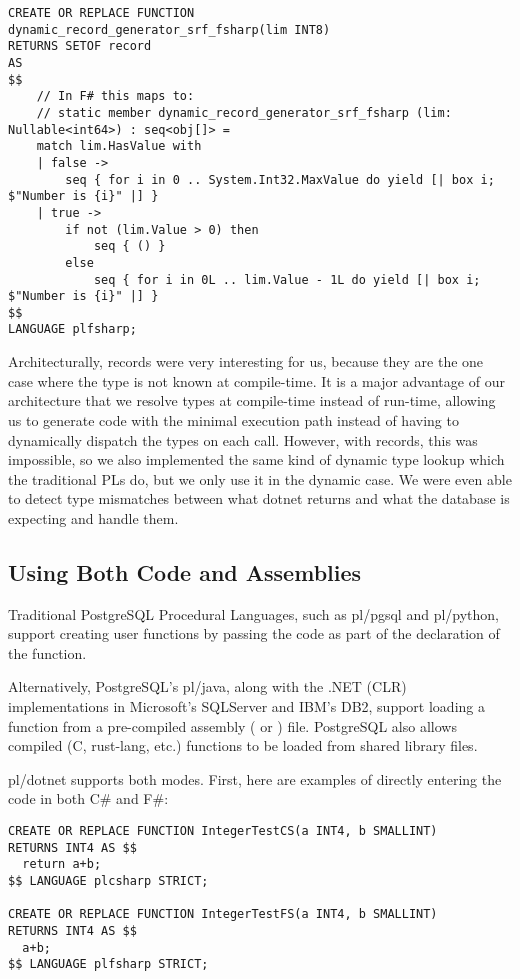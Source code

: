 \documentclass[sigconf,techreport,authorversion,nonacm]{acmart}
\newcommand{\dotnet}{.NET }
\begin{document}
\begin{listing}[H]
\begin{verbatim}
CREATE OR REPLACE FUNCTION
dynamic_record_generator_srf_fsharp(lim INT8)
RETURNS SETOF record
AS
$$
    // In F# this maps to:
    // static member dynamic_record_generator_srf_fsharp (lim: Nullable<int64>) : seq<obj[]> =
    match lim.HasValue with
    | false ->
        seq { for i in 0 .. System.Int32.MaxValue do yield [| box i; $"Number is {i}" |] }
    | true ->
        if not (lim.Value > 0) then
            seq { () }
        else
            seq { for i in 0L .. lim.Value - 1L do yield [| box i; $"Number is {i}" |] }
$$
LANGUAGE plfsharp;
\end{verbatim}
\end{listing}

Architecturally, records were very interesting for us, because they are
the one case where the type is not known at compile-time.  It is a major
advantage of our architecture that we resolve types at compile-time
instead of run-time, allowing us to generate code with the minimal
execution path instead of having to dynamically dispatch the types
on each call.  However, with records, this was impossible, so we also
implemented the same kind of dynamic type lookup which the traditional
PLs do, but we only use it in the dynamic case.  We were even able to
detect type mismatches between what dotnet returns and what the database
is expecting and handle them.

\subsection{Using Both Code and Assemblies}

Traditional PostgreSQL Procedural Languages, such as pl/pgsql
and pl/python, support creating user functions by passing the
code as part of the declaration of the function.

Alternatively, PostgreSQL's pl/java, along with the \dotnet (CLR)
implementations in Microsoft's SQLServer and IBM's DB2, support
loading a function from a pre-compiled assembly (
or ) file.  PostgreSQL also allows compiled
(C, rust-lang, etc.) functions to be loaded from shared library files.

pl/dotnet supports both modes.  First, here are examples of directly
entering the code in both C\# and F\#:

\begin{listing}[H]
\begin{verbatim}
CREATE OR REPLACE FUNCTION IntegerTestCS(a INT4, b SMALLINT)
RETURNS INT4 AS $$
  return a+b;
$$ LANGUAGE plcsharp STRICT;

CREATE OR REPLACE FUNCTION IntegerTestFS(a INT4, b SMALLINT)
RETURNS INT4 AS $$
  a+b;
$$ LANGUAGE plfsharp STRICT;
\end{verbatim}
\end{listing}
\end{document}
